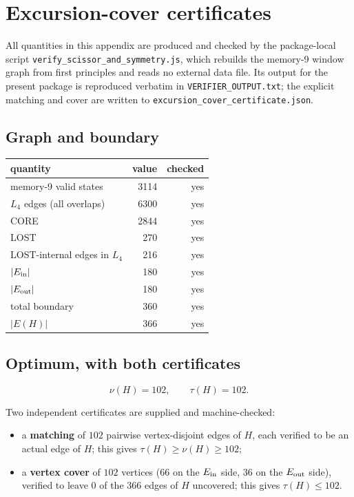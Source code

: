 \section{Excursion-cover certificates}
\label{app:C}

All quantities in this appendix are produced and checked by the package-local
script \texttt{verify\_scissor\_and\_symmetry.js}, which rebuilds the memory-9
window graph from first principles and reads no external data file. Its
output for the present package is reproduced verbatim in
\texttt{VERIFIER\_OUTPUT.txt}; the explicit matching and cover are written to
\texttt{excursion\_cover\_certificate.json}.

\subsection*{Graph and boundary}

\begin{center}
\begin{tabular}{lrr}
\toprule
quantity & value & checked \\
\midrule
memory-9 valid states & 3114 & yes \\
\(L_4\) edges (all overlaps) & 6300 & yes \\
CORE & 2844 & yes \\
LOST & 270 & yes \\
LOST-internal edges in \(L_4\) & 216 & yes \\
\(|E_{\rm in}|\) & 180 & yes \\
\(|E_{\rm out}|\) & 180 & yes \\
total boundary & 360 & yes \\
\(|E(H)|\) & 366 & yes \\
\bottomrule
\end{tabular}
\end{center}

\subsection*{Optimum, with both certificates}

\[
\nu(H)=102,\qquad \tau(H)=102 .
\]

Two independent certificates are supplied and machine-checked:

\begin{itemize}
\item a \textbf{matching} of \(102\) pairwise vertex-disjoint edges of \(H\),
      each verified to be an actual edge of \(H\); this gives
      \(\tau(H)\ge\nu(H)\ge102\);
\item a \textbf{vertex cover} of \(102\) vertices (66 on the \(E_{\rm in}\)
      side, 36 on the \(E_{\rm out}\) side), verified to leave \(0\) of the
      \(366\) edges of \(H\) uncovered; this gives \(\tau(H)\le102\).
\end{itemize}

